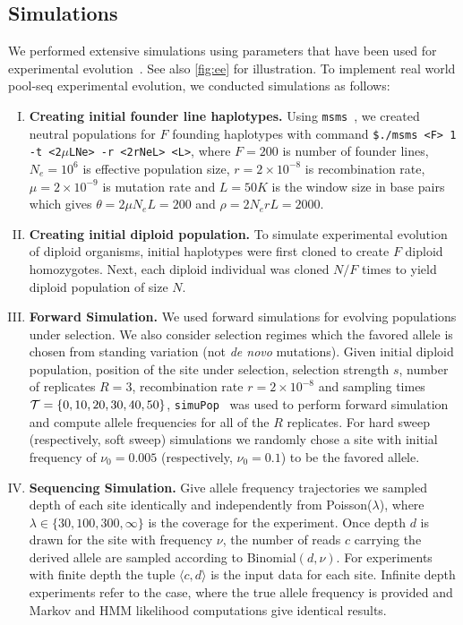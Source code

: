 		


\subsection{Simulations}
We performed extensive simulations using parameters that have been
used for \dmel experimental
evolution~\cite{kofler2013guide}. See also \ref{fig:ee} 
for
illustration. To implement real world pool-seq experimental evolution, we 
conducted simulations as follows:
\begin{enumerate}[I.]
\item {\bf Creating initial founder line haplotypes.} Using
  \texttt{msms}~\cite{ewing2010msms}, we created neutral populations for $F$
  founding haplotypes with command \texttt{\$./msms
    <F> 1 -t <2$\mu$LNe> -r <2rNeL> <L>}, where $F=200$ is number of
  founder lines, $N_e=10^6$ is effective population size,
  $r=2\times10^{-8}$ is recombination rate, $\mu=2\times 10^{-9}$ is
  mutation rate and $L=50K$ is the window size in base pairs which
  gives $\theta=2\mu N_eL=200$ and $\rho=2N_erL=2000$.
  
\item{\bf Creating initial diploid population.} To simulate
  experimental evolution of diploid organisms, initial haplotypes were
  first cloned to create $F$ diploid homozygotes. Next, each diploid
  individual was cloned $N/F$ times to yield diploid population of
  size $N$.

\item{\bf Forward Simulation.} We used forward simulations for
  evolving populations under selection. We also consider selection
  regimes which the favored allele is chosen from standing
  variation (not \emph{de novo} mutations). Given initial diploid
  population, position of the site under selection, selection strength
  $s$, number of replicates $R=3$, recombination rate
  $r=2\times10^{-8}$ and sampling times ${\cal T}=\{0,10,20,30,40,50\}$,
  \texttt{simuPop}~\cite{peng2005simupop} was used to perform forward
  simulation and compute allele frequencies for all of the $R$
  replicates.  For hard sweep (respectively, soft sweep) simulations
  we randomly chose a site with initial frequency of $\nu_0=0.005$
  (respectively, $\nu_0=0.1$) to be the favored allele.
\item{\bf Sequencing Simulation.} Give allele frequency trajectories
  we sampled depth of each site identically and independently from
  Poisson($\lambda$), where $\lambda \in \{30,100,300,\infty\}$ is the
  coverage for the experiment. Once depth $d$ is drawn for the site
  with frequency $\nu$, the number of reads $c$ carrying the derived
  allele are sampled according to Binomial$(d,\nu)$. For experiments
  with finite depth the tuple $\langle c,d\rangle$ is the input data
  for each site. Infinite depth experiments refer to the case, where
  the true allele frequency is provided and Markov and HMM likelihood
  computations give identical results.
\end{enumerate}
